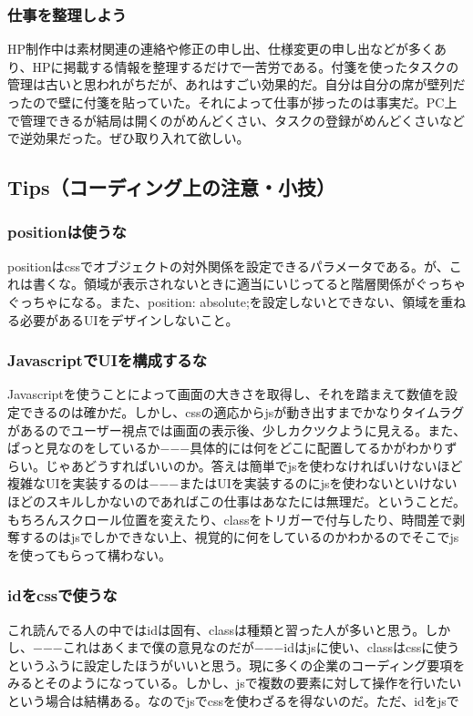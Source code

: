 \documentclass[dvipdfmx,jb5]{jarticle}
\begin{document}
 \subsubsection{仕事を整理しよう}
 HP制作中は素材関連の連絡や修正の申し出、仕様変更の申し出などが多くあり、HPに掲載する情報を整理するだけで一苦労である。付箋を使ったタスクの管理は古いと思われがちだが、あれはすごい効果的だ。自分は自分の席が壁列だったので壁に付箋を貼っていた。それによって仕事が捗ったのは事実だ。PC上で管理できるが結局は開くのがめんどくさい、タスクの登録がめんどくさいなどで逆効果だった。ぜひ取り入れて欲しい。
 \subsection{Tips（コーディング上の注意・小技）}
 \subsubsection{positionは使うな}
 positionはcssでオブジェクトの対外関係を設定できるパラメータである。が、これは書くな。領域が表示されないときに適当にいじってると階層関係がぐっちゃぐっちゃになる。また、position: absolute;を設定しないとできない、領域を重ねる必要があるUIをデザインしないこと。

 
 \subsubsection{JavascriptでUIを構成するな}
 Javascriptを使うことによって画面の大きさを取得し、それを踏まえて数値を設定できるのは確かだ。しかし、cssの適応からjsが動き出すまでかなりタイムラグがあるのでユーザー視点では画面の表示後、少しカクツクように見える。また、ぱっと見なのをしているか−−−具体的には何をどこに配置してるかがわかりずらい。じゃあどうすればいいのか。答えは簡単でjsを使わなければいけないほど複雑なUIを実装するのは−−−またはUIを実装するのにjsを使わないといけないほどのスキルしかないのであればこの仕事はあなたには無理だ。ということだ。もちろんスクロール位置を変えたり、classをトリガーで付与したり、時間差で剥奪するのはjsでしかできない上、視覚的に何をしているのかわかるのでそこでjsを使ってもらって構わない。
 
\subsubsection{idをcssで使うな}
これ読んでる人の中ではidは固有、classは種類と習った人が多いと思う。しかし、−−−これはあくまで僕の意見なのだが−−−idはjsに使い、classはcssに使うというふうに設定したほうがいいと思う。現に多くの企業のコーディング要項をみるとそのようになっている。しかし、jsで複数の要素に対して操作を行いたいという場合は結構ある。なのでjsでcssを使わざるを得ないのだ。ただ、idをjsで
 
\end{document}
